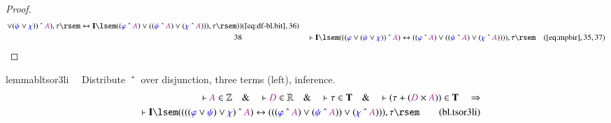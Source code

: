 \begin{proof}
\begin{align}
      \vee ( \mw{\psi} \vee \mw{\chi} ) ) ~\string^~ \mc{A}
      ) , \tau \rsem \leftrightarrow \mathbf{I} \lsem ( (
      \mw{\varphi} ~\string^~ \mc{A} ) \vee ( ( \mw{\psi}
      ~\string^~ \mc{A} ) \vee ( \mw{\chi} ~\string^~
      \mc{A} ) ) ) , \tau \rsem )
      )&(\mbox{\ref{eq:df-bl.bit}},36)\notag
  \\ 38 &&  & \vdash \mathbf{I} \lsem ( ( ( \mw{\varphi} \vee ( \mw{\psi} \vee
      \mw{\chi} ) ) ~\string^~ \mc{A} ) \leftrightarrow ( (
      \mw{\varphi} ~\string^~ \mc{A} ) \vee ( ( \mw{\psi}
      ~\string^~ \mc{A} ) \vee ( \mw{\chi} ~\string^~
      \mc{A} ) ) ) ) , \tau
      \rsem&(\mbox{\ref{eq:mpbir}},35,37)\notag
\end{align}
\end{proof}

\begin{restatable}{lemma}{bltsor3li}~~ Distribute $~\string^~$ over
disjunction, three terms (left), inference.
\begin{align}
\vdash \mc{A} \in \mathbb{Z}\quad\&\quad \vdash \mc{D} \in
    \mathbb{R}\quad\&\quad \vdash \tau \in \mathbf{T}\quad\&\quad \vdash ( \tau
    + ( \mc{D} \times \mc{A} ) ) \in \mathbf{T}\quad\Rightarrow \notag \\ %
     \quad \vdash
    \mathbf{I} \lsem ( ( ( ( \mw{\varphi} \vee \mw{\psi} ) \vee \mw{\chi} )
    ~\string^~ \mc{A} ) \leftrightarrow ( ( ( \mw{\varphi} ~\string^~ \mc{A} )
    \vee ( \mw{\psi} ~\string^~ \mc{A} ) ) \vee ( \mw{\chi} ~\string^~ \mc{A} )
    ) ) , \tau \rsem\label{eq:bl.tsor3li}\tag{bl.tsor3li}
\end{align}
\end{restatable}

